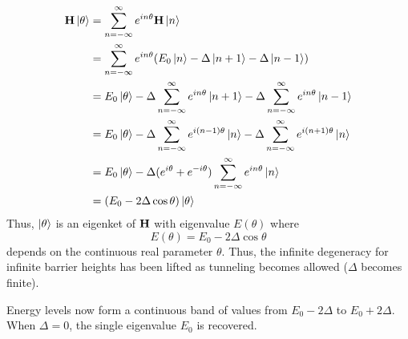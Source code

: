 \documentclass[12pt,a4paper,titlepage]{article}
\begin{document}
\begin{equation}
\begin{aligned}
\vb{H}\ket{\theta}&=\sum_{n=-\infty}^{\infty}e^{in\theta}\vb{H}\ket{n}\\
&=\sum_{n=-\infty}^{\infty}e^{in\theta}\qty(E_{0}\ket{n}-\Delta\ket{n+1}-\Delta\ket{n-1})\\
&=E_{0}\ket{\theta}-\Delta\sum_{n=-\infty}^{\infty}e^{in\theta}\ket{n+1}-\Delta\sum_{n=-\infty}^{\infty}e^{in\theta}\ket{n-1}\\
&=E_{0}\ket{\theta}-\Delta\sum_{n=-\infty}^{\infty}e^{i(n-1)\theta}\ket{n}-\Delta\sum_{n=-\infty}^{\infty}e^{i(n+1)\theta}\ket{n}\\
&=E_{0}\ket{\theta}-\Delta(e^{i\theta}+e^{-i\theta})\sum_{n=-\infty}^{\infty}e^{in\theta}\ket{n}\\
&=(E_{0}-2\Delta\cos\theta)\ket{\theta}
\end{aligned}
\end{equation}
Thus, $\ket{\theta}$ is an eigenket of $\vb{H}$ with eigenvalue $E(\theta)$ where
\begin{equation}
E(\theta)=E_{0}-2\Delta\cos\theta
\end{equation}
depends on the continuous real parameter $\theta$. Thus, the infinite degeneracy for infinite barrier heights has been lifted as tunneling becomes allowed ($\Delta$ becomes finite).
\begin{center}
\end{center}
Energy levels now form a continuous band of values from $E_{0}-2\Delta$ to $E_{0}+2\Delta$. When $\Delta=0$, the single eigenvalue $E_{0}$ is recovered.\\
\end{document}
